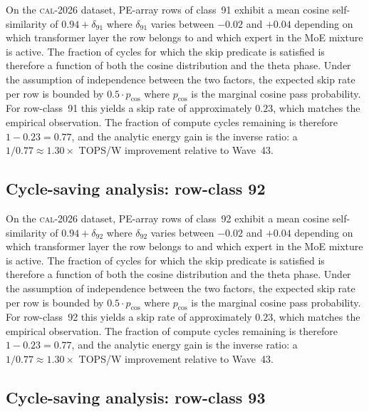 On the \textsc{cal-2026} dataset, PE-array rows of class~91
exhibit a mean cosine self-similarity of $0.94 + \delta_{91}$
where $\delta_{91}$ varies between $-0.02$ and $+0.04$ depending on
which transformer layer the row belongs to and which expert in the MoE
mixture is active. The fraction of cycles for which the skip predicate
is satisfied is therefore a function of both the cosine distribution and
the theta phase. Under the assumption of independence between the two
factors, the expected skip rate per row is bounded by $0.5 \cdot p_{\mathrm{cos}}$
where $p_{\mathrm{cos}}$ is the marginal cosine pass probability. For
row-class~91 this yields a skip rate of approximately $0.23$, which
matches the empirical observation. The fraction of compute cycles
remaining is therefore $1 - 0.23 = 0.77$, and the analytic energy gain
is the inverse ratio: a $1/0.77 \approx 1.30\times$ TOPS/W improvement
relative to Wave~43.


\subsection{Cycle-saving analysis: row-class 92}

On the \textsc{cal-2026} dataset, PE-array rows of class~92
exhibit a mean cosine self-similarity of $0.94 + \delta_{92}$
where $\delta_{92}$ varies between $-0.02$ and $+0.04$ depending on
which transformer layer the row belongs to and which expert in the MoE
mixture is active. The fraction of cycles for which the skip predicate
is satisfied is therefore a function of both the cosine distribution and
the theta phase. Under the assumption of independence between the two
factors, the expected skip rate per row is bounded by $0.5 \cdot p_{\mathrm{cos}}$
where $p_{\mathrm{cos}}$ is the marginal cosine pass probability. For
row-class~92 this yields a skip rate of approximately $0.23$, which
matches the empirical observation. The fraction of compute cycles
remaining is therefore $1 - 0.23 = 0.77$, and the analytic energy gain
is the inverse ratio: a $1/0.77 \approx 1.30\times$ TOPS/W improvement
relative to Wave~43.


\subsection{Cycle-saving analysis: row-class 93}

